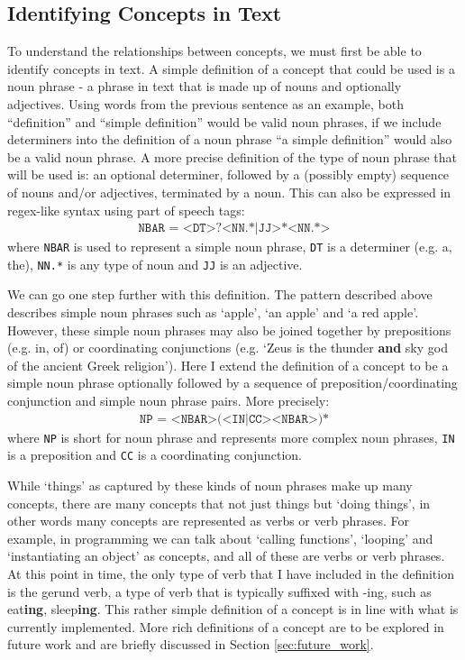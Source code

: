 \documentclass[12pt]{article}
\begin{document}
\subsection{Identifying Concepts in Text} \label{sec:idenifying_concepts}
To understand the relationships between concepts, we must first be able to identify concepts in text. A simple definition of a concept that could be used is a noun phrase - a phrase in text that is made up of nouns and optionally adjectives. Using words from the previous sentence as an example, both ``definition'' and ``simple definition'' would be valid noun phrases, if we include determiners  into the definition of a noun phrase ``a simple definition'' would also be a valid noun phrase. A more precise definition of the type of noun phrase that will be used is: an optional determiner, followed by a (possibly empty) sequence of nouns and/or adjectives, terminated by a noun. This can also be expressed in regex-like syntax using part of speech tags: 
\begin{align} \label{eq:nbar_pattern}
    \texttt{NBAR = <DT>?<NN.*|JJ>*<NN.*>}
\end{align}
where \texttt{NBAR} is used to represent a simple noun phrase, \texttt{DT} is a determiner (e.g. a, the), \texttt{NN.*} is any type of noun and \texttt{JJ} is an adjective.

We can go one step further with this definition. The pattern described above describes simple noun phrases such as `apple', `an apple' and `a red apple'. However, these simple noun phrases may also be joined together by prepositions (e.g. in, of) or coordinating conjunctions (e.g. `Zeus is the thunder \textbf{and} sky god of the ancient Greek religion'). Here I extend the definition of a concept to be a simple noun phrase optionally followed by a sequence of preposition/coordinating conjunction and simple noun phrase pairs. More precisely: 
\begin{align} \label{eq:np_pattern}
    \texttt{NP = <NBAR>(<IN|CC><NBAR>)*}
\end{align}
where \texttt{NP} is short for noun phrase and represents more complex noun phrases, \texttt{IN} is a preposition and \texttt{CC} is a coordinating conjunction. 

While `things' as captured by these kinds of noun phrases make up many concepts, there are many concepts that not just things but `doing things', in other words many concepts are represented as verbs or verb phrases. For example, in programming we can talk about `calling functions', `looping' and `instantiating an object' as concepts, and all of these are verbs or verb phrases. At this point in time, the only type of verb that I have included in the definition is the gerund verb, a type of verb that is typically suffixed with -ing, such as eat\textbf{ing}, sleep\textbf{ing}.
This rather simple definition of a concept is in line with what is currently implemented. More rich definitions of a concept are to be explored in future work and are briefly discussed in Section \ref{sec:future_work}.
\end{document}
